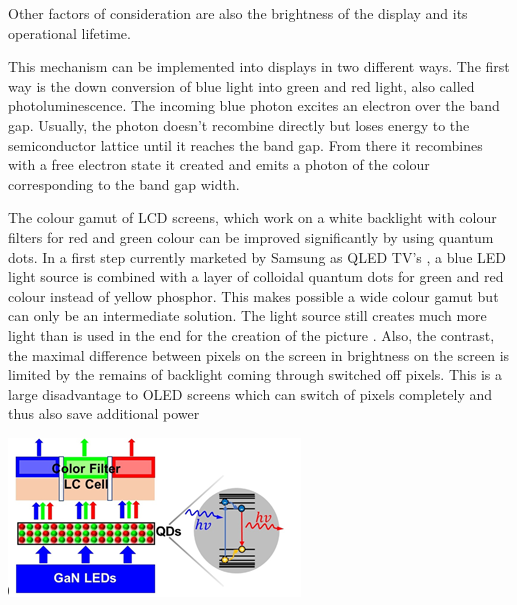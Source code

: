 \documentclass[11pt,a4paper]{article} %
\begin{document}
\begin{multicols}{2}
    Other factors of consideration are also the brightness of the display and
    its operational lifetime.


    This mechanism can be implemented into displays in two different ways. The
    first way is the down conversion of blue light into green and red light,
    also called photoluminescence. The incoming blue photon excites an electron
    over
    the band gap. Usually, the photon doesn’t recombine directly but loses
    energy
    to the semiconductor lattice until it reaches the band gap. From there it
    recombines with a free electron state it created and emits a photon of
    the colour corresponding to the band gap width.

    The colour gamut of  LCD screens, which work on a white backlight with
    colour filters for red and green colour can be improved significantly by
    using quantum dots. In a first step currently marketed by Samsung as QLED TV’s
    \cite{ctarticle} ,
    a blue LED light source is combined with a layer of colloidal quantum dots
    for
    green and red colour instead of yellow phosphor. This makes possible a wide
    colour gamut but can only be an intermediate solution. The light source
    still
    creates much more light than is used in the end for the creation of the
    picture
    \cite{Shu2020}. Also, the contrast, the maximal difference between pixels
    on the screen in brightness on the screen
    is limited by the remains of backlight coming through switched off pixels.
    This is a large disadvantage to OLED screens which can switch of pixels
    completely
    and thus also save additional power\cite{Brus1998}%

    \begin{Figure}
        \centering
        \includegraphics[width=0.9\linewidth]{photolumLED.png}
    \end{Figure}


\end{multicols}
\end{document}
